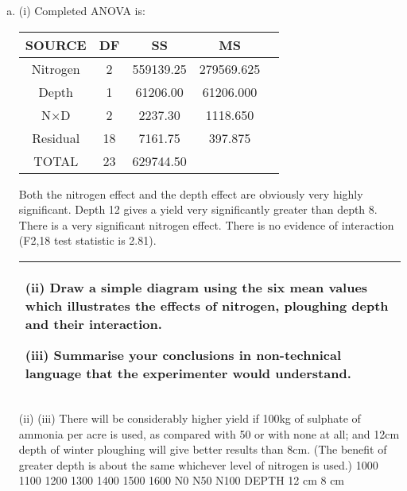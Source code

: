 \documentclass[a4paper,12pt]{article}
\begin{document}
\begin{enumerate}[(a)]
\item 
(i) Completed ANOVA is:

\begin{center}
    \begin{tabular}{|c|c|c|c|c|}
 SOURCE & DF &  SS & MS & \\ \hline
Nitrogen & 2 & 559139.25 & 279569.625& \\ \hline
Depth & 1 & 61206.00 & 61206.000 & \\ \hline
N×D & 2 & 2237.30 & 1118.650 & \\ \hline
Residual & 18 & 7161.75 & 397.875 & \\ \hline
TOTAL & 23 & 629744.50  & & \\ \hline
    
    \end{tabular}
\end{center}

Both the nitrogen effect and the depth effect are obviously very highly significant.
Depth 12 gives a yield very significantly greater than depth 8. There is a very
significant nitrogen effect.
There is no evidence of interaction (F2,18 test statistic is 2.81).
\newpage

\begin{table}[ht!]
\centering
\begin{tabular}{|p{15cm}|}
\hline
(ii) Draw a simple diagram using the six mean values which illustrates the effects of nitrogen, ploughing depth and their interaction.  
 
(iii) Summarise your conclusions in non-technical language that the experimenter would understand.  
 
\\ \hline
\end{tabular}
\end{table}
(ii)
(iii) There will be considerably higher yield if 100kg of sulphate of ammonia per
acre is used, as compared with 50 or with none at all; and 12cm depth of winter
ploughing will give better results than 8cm. (The benefit of greater depth is about the
same whichever level of nitrogen is used.)
1000
1100
1200
1300
1400
1500
1600
N0 N50 N100
DEPTH
12 cm
8 cm
\end{enumerate}
\end{document}
